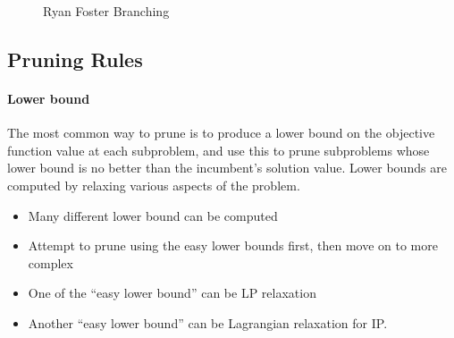                 \begin{figure}[H]
                    \centering
                    \caption{Ryan Foster Branching}
                \end{figure}

        \subsection{Pruning Rules}
            \paragraph{Lower bound}
                The most common way to prune is to produce a lower bound on the objective function value at each subproblem, and use this to prune subproblems whose lower bound is no better than the incumbent’s solution value. Lower bounds are computed by relaxing various aspects of the problem.

                \begin{itemize}
                    \item Many different lower bound can be computed
                    \item Attempt to prune using the easy lower bounds first, then move on to more complex
                    \item One of the ``easy lower bound'' can be LP relaxation
                    \item Another ``easy lower bound'' can be Lagrangian relaxation for IP.
                \end{itemize}

